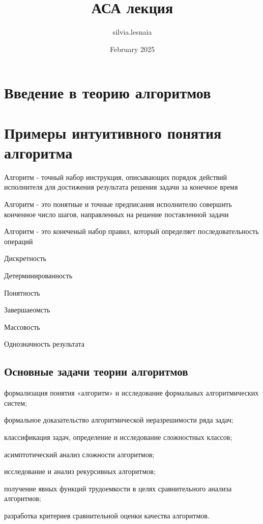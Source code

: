 \documentclass{article}
\title{АСА лекция}
\author{silvia.lesnaia }
\date{February 2025}
\begin{document}
\maketitle


\section{Введение в теорию алгоритмов}

\section{Примеры интуитивного понятия алгоритма}

Алгоритм - точный набор инструкция, описывающих порядок действий исполнителя для достижения результата решения задачи за конечное время

Алгоритм - это понятные и точные предписания исполнителю совершить конченное число шагов, направленных на решение поставленной задачи

Алгоритм - это конеченый набор правил, который определяет последовательность операций



Дискретность

Детерминированность

Понятность

Завершаеомсть

Массовость

Однозначность результата 



\subsection{Основные задачи теории алгоритмов}

формализация понятия «алгоритм» и  исследование формальных алгоритмических систем;

формальное доказательство алгоритмической неразрешимости ряда задач;

классификация задач, определение и исследование сложностных классов;

асимптотический анализ сложности алгоритмов;

исследование и анализ рекурсивных алгоритмов;

получение явных функций трудоемкости в целях сравнительного анализа алгоритмов;

разработка критериев сравнительной оценки качества алгоритмов.
\end{document}
